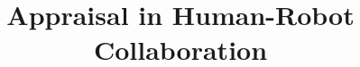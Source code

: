 \documentclass{aamas2016}
\begin{document}


\title{Appraisal in Human-Robot Collaboration}




%
%
%
%

%

\end{document}
